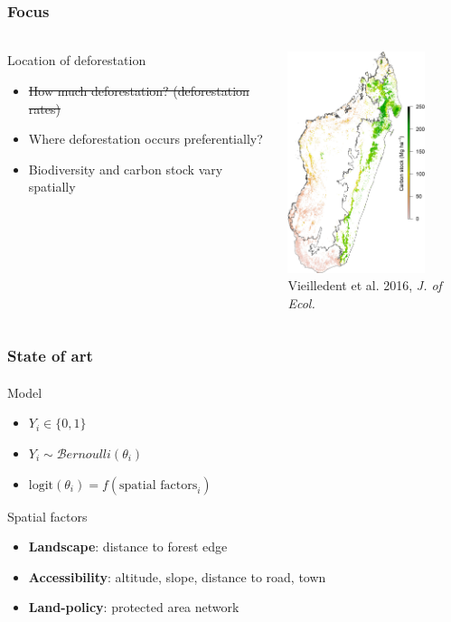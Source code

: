 \documentclass[slidetop,10pt,dvipsnames,leqno,fleqn]{beamer} %
\newcommand{\logit}{\text{logit}}
\begin{document}
\begin{frame}
  \frametitle{Focus}
  \framesubtitle{}
  \begin{columns}[c]
    \begin{column}{0.5\textwidth}
      \begin{block}{Location of deforestation}
        \begin{itemize}
        \item \sout{How much deforestation? (deforestation rates)}
        \item Where deforestation occurs preferentially?
        \item Biodiversity and carbon stock vary spatially
        \end{itemize}
      \end{block}    
    \end{column}
    \begin{column}{0.5\textwidth}
      \centering \includegraphics[width=4cm]{./Figures/Vieilledent2016-JoE.jpg}\\
      {\small Vieilledent et al. 2016, \textit{J. of Ecol.}}
    \end{column}
  \end{columns}
\end{frame}

\begin{frame}
  \frametitle{State of art}
  \framesubtitle{}
  \begin{block}{Model}
    \begin{itemize}
    \item $Y_i \in \{0, 1\}$
    \item $Y_i \sim \mathcal{B}ernoulli(\theta_i)$
    \item $\logit(\theta_i) = f(\text{spatial factors}_i)$
    \end{itemize}
  \end{block}
  \begin{block}{Spatial factors}
    \begin{itemize}
    \item \textbf{Landscape}: distance to forest edge
    \item \textbf{Accessibility}: altitude, slope, distance to road, town
    \item \textbf{Land-policy}: protected area network
    \end{itemize}
  \end{block}
\end{frame}
\end{document}
